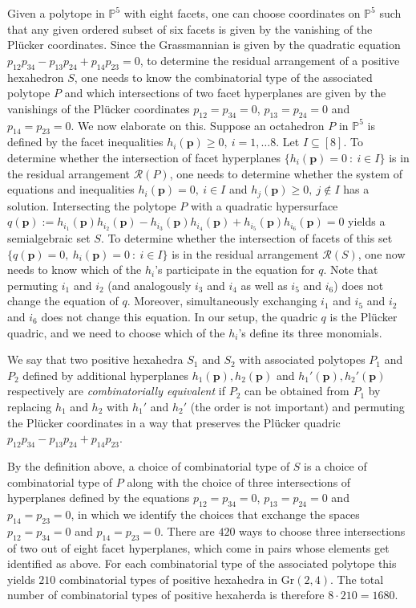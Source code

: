 \documentclass[12pt]{extarticle}
\theoremstyle{definition}
\begin{document}
Given a polytope in $\mathbb{P}^5$ with eight facets, one can choose coordinates on $\mathbb{P}^5$ such that any given ordered subset of six facets is given by the vanishing of the Pl\"ucker coordinates. Since the Grassmannian is given by the quadratic equation $p_{12}p_{34}-p_{13}p_{24}+p_{14}p_{23} = 0$, to determine the residual arrangement of a positive hexahedron $S$, one needs to know the combinatorial type of the associated polytope $P$ and which intersections of two facet hyperplanes are given by the vanishings of the Pl\"ucker coordinates $p_{12}=p_{34}=0$, $p_{13}=p_{24}=0$ and $p_{14}=p_{23}=0$. We now elaborate on this. Suppose an octahedron $P$ in $\mathbb{P}^5$ is defined by the facet inequalities $h_i(\mathbf{p})\geq0,\ i=1,\ldots 8$. Let $I\subseteq [8]$. To determine whether the intersection of facet hyperplanes $\{h_i(\mathbf{p})=0\ :\ i\in I\}$ is in the residual arrangement $\mathcal{R}(P)$, one needs to determine whether the system of equations and inequalities $h_i(\mathbf{p})=0, \ i\in I$ and $h_j(\mathbf{p})\geq 0, \ j\not\in I$ has a solution. Intersecting the polytope $P$ with a quadratic hypersurface $q(\mathbf{p}):=h_{i_1}(\mathbf{p})h_{i_2}(\mathbf{p})-h_{i_3}(\mathbf{p})h_{i_4}(\mathbf{p})+h_{i_5}(\mathbf{p})h_{i_6}(\mathbf{p})=0$ yields a semialgebraic set $S$. To determine whether the intersection of facets of this set $\{q(\mathbf{p})=0,\ h_i(\mathbf{p})=0\ :\ i\in I\}$ is in the residual arrangement $\mathcal{R}(S)$, one now needs to know which of the $h_i$'s participate in the equation for $q$. Note that permuting $i_{1}$ and $i_2$ (and analogously $i_3$ and $i_4$ as well as $i_5$ and $i_{6}$) does not change the equation of $q$. Moreover, simultaneously exchanging $i_1$ and $i_5$ and $i_2$ and $i_6$ does not change this equation. In our setup, the quadric $q$ is the Pl\"ucker quadric, and we need to choose which of the $h_i$'s define its three monomials. 

We say that two positive hexahedra $S_1$ and $S_2$ with associated polytopes $P_1$ and $P_2$ defined by additional hyperplanes $h_1(\mathbf{p}), h_2(\mathbf{p})$ and $h_1'(\mathbf{p}), h_2'(\mathbf{p})$ respectively are \emph{combinatorially equivalent} if $P_2$ can be obtained from $P_1$ by replacing $h_1$ and $h_2$ with $h_1'$ and $h_2'$ (the order is not important) and permuting the Pl\"ucker coordinates in a way that preserves the Pl\"ucker quadric $p_{12}p_{34}-p_{13}p_{24}+p_{14}p_{23}$.

By the definition above, a choice of combinatorial type of $S$ is a choice of combinatorial type of $P$ along with the choice of three intersections of hyperplanes defined by the equations $p_{12}=p_{34}=0$, $p_{13}=p_{24}=0$ and $p_{14}=p_{23}=0$, in which we identify the choices that exchange the spaces $p_{12}=p_{34}=0$ and $p_{14}=p_{23}=0$. There are $420$ ways to choose three intersections of two out of eight facet hyperplanes, which come in pairs whose elements get identified as above. For each combinatorial type of the associated polytope this yields $210$ combinatorial types of positive hexahedra in $\mathrm{Gr}(2,4)$. The total number of combinatorial types of positive hexaherda is therefore $8\cdot 210 = 1680$.
\end{document}
